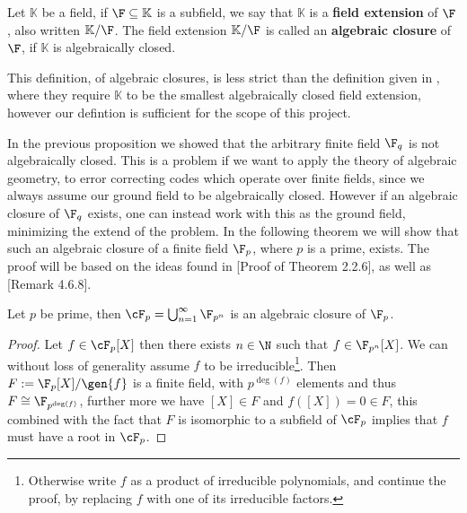 \begin{definition}
  Let $\mathbb{K}$ be a field, if $\F \subseteq \mathbb{K}$ is a subfield, we say that $\mathbb{K}$ is a \textbf{field extension} of $\F$, also written $\mathbb{K} / \F$. The field extension $\mathbb{K}/\F$ is called an \textbf{algebraic closure} of $\F$, if $\mathbb{K}$ is algebraically closed.
\end{definition}
\begin{remark}
  This definition, of algebraic closures, is less strict than the definition given in \citep{alg_notes}, where they require $\mathbb{K}$ to be the smallest algebraically closed field extension, however our defintion is sufficient for the scope of this project.
\end{remark}
In the previous proposition we showed that the arbitrary finite field $\F_{q}$ is not algebraically closed.
This is a problem if we want to apply the theory of algebraic geometry, to error correcting codes which operate over finite fields, since we always assume our ground field to be algebraically closed.
However if an algebraic closure of $\F_{q}$ exists, one can instead work with this as the ground field, minimizing the extend of the problem. In the following theorem we will show that such an algebraic closure of a finite field $\F_{p}$, where $p$ is a prime, exists.
The proof will be based on the ideas found in \citep{Galois_theory}[Proof of Theorem 2.2.6], as well as \cite{alg_lauritzen}[Remark 4.6.8].
\begin{theorem}
   Let $p$ be prime, then $\cF_{p} = \bigcup_{n = 1}^{\infty} \F_{p^{n}}$ is an algebraic closure of $\F_p$.
 \end{theorem}
 \begin{proof}
   Let $f \in \cF_{p}[X]$ then there exists $n \in \N$ such that $f \in \F_{p^{n}}[X]$.
   We can without loss of generality assume $f$ to be irreducible\footnote{Otherwise write $f$ as a product of irreducible polynomials, and continue the proof, by replacing $f$ with one of its irreducible factors.}. Then $F := \F_{p}[X] / \gen{f}$ is a finite field, with $p^{\deg(f)}$ elements and thus $F \cong \F_{p^{\deg(f)}}$, further more we have $[X] \in F$ and $f([X]) = 0 \in F$, this combined with the fact that $F$ is isomorphic to a subfield of $\cF_{p}$ implies that $f$ must have a root in $\cF_{p}$.
 \end{proof}
